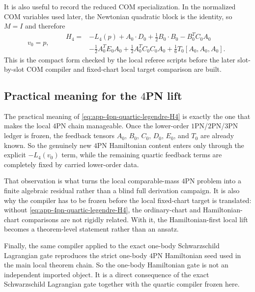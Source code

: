 \documentclass[11pt]{article}
\begin{document}
It is also useful to record the reduced COM specialization.  In the normalized
COM variables used later, the Newtonian quadratic block is the identity, so
\(M=I\) and therefore
\begin{equation}
v_0=p,
\qquad
\begin{aligned}
H_4={}&-L_4(p)
+A_0\cdot D_0
+\frac12B_0\cdot B_0
-B_0^TC_0A_0
\\[0.5ex]
&
-\frac12A_0^TE_0A_0
+\frac12A_0^TC_0C_0A_0
+\frac16T_0[A_0,A_0,A_0].
\end{aligned}
\label{eq:app-4pn-quartic-legendre-H4-com}
\end{equation}
This is the compact form checked by the local referee scripts before the later
slot-by-slot COM compiler and fixed-chart local target comparison are built.

\subsection{Practical meaning for the \texorpdfstring{$4$}{4}PN lift}
\label{app:quartic-legendre-meaning}

The practical meaning of \eqref{eq:app-4pn-quartic-legendre-H4} is exactly the
one that makes the local $4$PN chain manageable.  Once the lower-order
$1$PN/$2$PN/$3$PN ledger is frozen, the feedback tensors \(A_0\), \(B_0\),
\(C_0\), \(D_0\), \(E_0\), and \(T_0\) are already known.  So the genuinely
new $4$PN Hamiltonian content enters only through the explicit
\(-L_4(v_0)\) term, while the remaining quartic feedback terms are completely
fixed by carried lower-order data.

That observation is what turns the local comparable-mass $4$PN problem into a
finite algebraic residual rather than a blind full derivation campaign.  It is
also why the compiler has to be frozen before the local fixed-chart target is
translated: without \eqref{eq:app-4pn-quartic-legendre-H4}, the ordinary-chart
and Hamiltonian-chart comparisons are not rigidly related.  With it, the
Hamiltonian-first local lift becomes a theorem-level statement rather than an
ansatz.

Finally, the same compiler applied to the exact one-body Schwarzschild
Lagrangian gate reproduces the strict one-body $4$PN Hamiltonian seed used in
the main local theorem chain.  So the one-body Hamiltonian gate is not an
independent imported object.  It is a direct consequence of the exact
Schwarzschild Lagrangian gate together with the quartic compiler frozen here.

\end{document}
